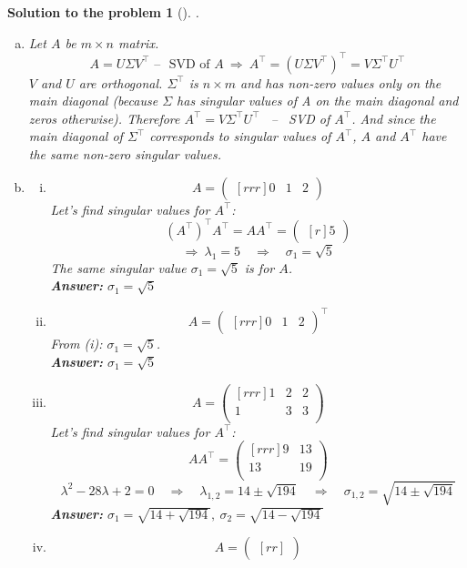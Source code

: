 \documentclass[12pt,a4]{article}
\newtheorem{solution}{Solution to the problem}
\newcommand{\answer}[1]{\textbf{Answer:} #1}
\begin{document}
\begin{solution}[] \rm .
\begin{enumerate}[(a)]
\item
Let $A$ be $m\times n$ matrix.
\[
A = U \Sigma V^\top \text{~--~ SVD of $A$}
~\Rightarrow~
A^\top = (U \Sigma V^\top)^\top = V \Sigma^\top U^\top
\]
$V$ and $U$ are orthogonal. $\Sigma^\top$ is $n\times m$ and has non-zero values only on the main diagonal (because $\Sigma$ has singular values of A on the main diagonal and zeros otherwise). Therefore $A^\top = V \Sigma^\top U^\top$ ~--~ SVD of $A^\top$. And since the main diagonal of $\Sigma^\top$ corresponds to singular values of $A^\top$, $A$ and $A^\top$ have the same non-zero singular values.
\item
\begin{enumerate}[(i)]
	\item
\[
A = 
\begin{pmatrix}[rrr]
0 & 1 & 2
\end{pmatrix}
\]
Let's find singular values for $A^\top$:
\[
(A^\top)^\top A^\top = AA^\top = \begin{pmatrix}[r] 5 \end{pmatrix}
\]
\[
\Rightarrow~
\lambda_1 = 5 
\quad
\Rightarrow
\quad
\sigma_1 = \sqrt5
\]
The same singular value $\sigma_1 = \sqrt5$ is for $A$.\\
\answer{$\sigma_1 = \sqrt5$}
	\item
\[
A = 
\begin{pmatrix}[rrr]
0 & 1 & 2
\end{pmatrix}^\top
\]
From (i): $\sigma_1 = \sqrt5$.\\
\answer{$\sigma_1 = \sqrt5$}
	\item
\[
A = 
\begin{pmatrix}[rrr]
1 & 2 & 2 \\
1 & 3 & 3 \\
\end{pmatrix}
\]
Let's find singular values for $A^\top$:
\[
AA^\top = 
\begin{pmatrix}[rrr]
9 & 13\\
13 & 19\\
\end{pmatrix}
\]
\[
\lambda^2 - 28 \lambda + 2 = 0
\quad
\Rightarrow
\quad
\lambda_{1,2} = 14 \pm \sqrt{194}
\quad
\Rightarrow
\quad
\sigma_{1,2} = \sqrt{14 \pm \sqrt{194}}
\]
\answer{$\sigma_1 = \sqrt{14 + \sqrt{194}}, ~ \sigma_2 = \sqrt{14 - \sqrt{194}}$}
	\item
\[
A =
\begin{pmatrix}[rr]

\end{pmatrix}\]
\end{enumerate}
\end{enumerate}
\end{solution}
\end{document}

